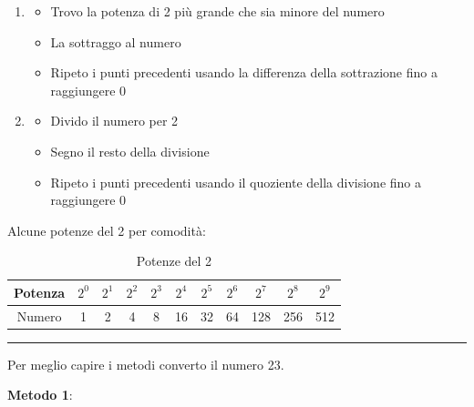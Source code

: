 \documentclass{article}
\begin{document}
    \begin{enumerate}
        \item \begin{itemize}
            \item Trovo la potenza di 2 più grande che sia minore del numero
            \item La sottraggo al numero
            \item Ripeto i punti precedenti usando la differenza della sottrazione fino a raggiungere 0
        \end{itemize}

        \vspace{5pt}
        
        \item \begin{itemize}
            \item Divido il numero per 2
            \item Segno il resto della divisione
            \item Ripeto i punti precedenti usando il quoziente della divisione fino a raggiungere 0
        \end{itemize}
    \end{enumerate}

    \vspace{6pt}
    
    \noindent Alcune potenze del 2 per comodità:
    
    \begin{table}[ht]
        \centering
        \begin{tabular}{c|c|c|c|c|c|c|c|c|c|c}
          Potenza & $2^0$ & $2^1$ & $2^2$ & $2^3$ & $2^4$ & $2^5$ & $2^6$ & $2^7$ & $2^8$ & $2^9$\\
             \hline
          \rule{0pt}{3ex}Numero & 1 & 2 & 4 & 8 & 16 & 32 & 64 & 128 & 256 & 512\\
        \end{tabular}
        \caption{Potenze del 2}
        \label{tab:power}
    \end{table}

    \vspace{3pt}

\noindent\rule{\textwidth}{0.5pt}

    \noindent Per meglio capire i metodi converto il numero 23.

    \vspace{5pt}

    \textbf{Metodo 1}:
\end{document}
